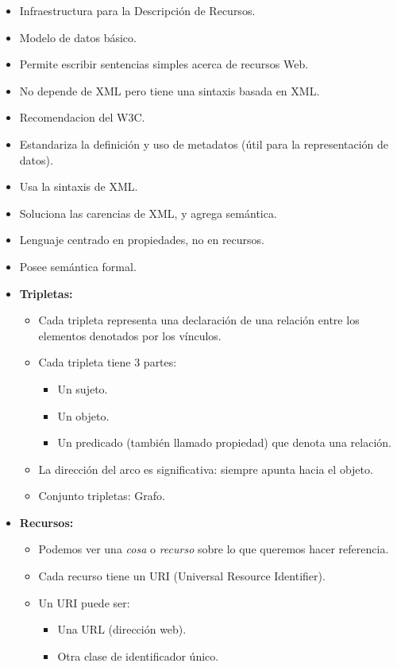 \documentclass[a4paper,12pt,twoside,final,spanish]{article}
\begin{document}
\begin{itemize}
\item Infraestructura para la Descripción de Recursos.
\item Modelo de datos básico.
\item Permite escribir sentencias simples acerca de recursos Web.
\item No depende de XML pero tiene una sintaxis basada en XML.
\item Recomendacion del W3C.
\item Estandariza la definición y uso de metadatos (útil para la representación de datos).
\item Usa la sintaxis de XML.
\item Soluciona las carencias de XML, y agrega semántica.
\item Lenguaje centrado en propiedades, no en recursos.
\item Posee semántica formal.
\item \textbf{Tripletas:}
	\begin{itemize}
	\item Cada tripleta representa una declaración de una relación entre los elementos 	denotados por los vínculos.
	\item Cada tripleta tiene 3 partes:
		\begin{itemize}
		\item Un sujeto.
		\item Un objeto.
		\item Un predicado (también llamado propiedad) que denota una relación. 
	\end{itemize}
	\item La dirección del arco es significativa: siempre apunta hacia el objeto.
	\item Conjunto tripletas: Grafo.
	\end{itemize}
\item \textbf{Recursos:}
	\begin{itemize}
	\item Podemos ver una \textit{cosa} o \textit{recurso} sobre lo que queremos hacer 	referencia.
	\item Cada recurso tiene un URI (Universal Resource Identifier).
	\item Un URI puede ser:
		\begin{itemize}
		\item Una URL (dirección web).
		\item Otra clase de identificador único.
		\end{itemize}

\end{itemize}
\end{itemize}
\end{document}
